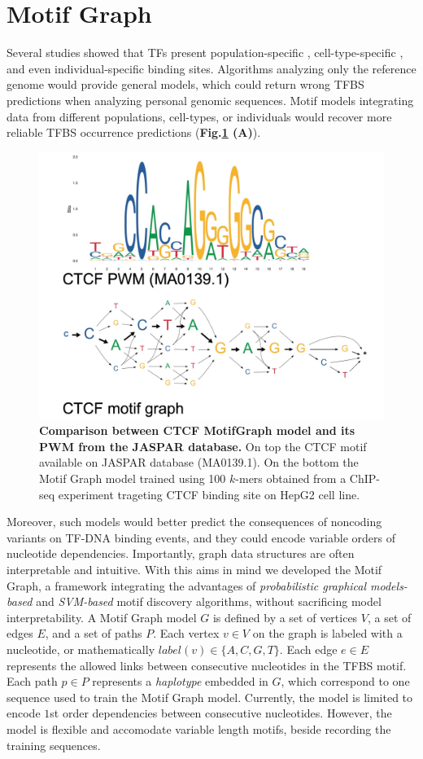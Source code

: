 \documentclass[a4paper, titlepage, 8pt, openright]{book}
\newcommand{\mychapter}[2]{
    \setcounter{chapter}{#1}
    \setcounter{section}{0}
    \chapter*{#2}
    \addcontentsline{toc}{chapter}{#2}
}
\begin{document}
\mychapter{3}{Motif Graph}
Several studies showed that TFs present population-specific \citep{kasowski2010variation}, cell-type-specific \citep{gertz2013distinct,arvey2012sequence}, and even individual-specific \citep{tognon2021grafimo} binding sites. Algorithms analyzing only the reference genome would provide general models, which could return wrong TFBS predictions when analyzing personal genomic sequences. Motif models integrating data from different populations, cell-types, or individuals would recover more reliable TFBS occurrence predictions (\textbf{Fig.\ref{fig:ctcf_mg} (A)}).
\begin{figure}
	\centering
	\includegraphics[width=\textwidth]{figures/ctcf_mg.jpg}
	\caption[Comparison between CTCF Motif Graph model and its PWM from the JASPAR database.]{\textbf{Comparison between CTCF MotifGraph model and its PWM from the JASPAR database.} On top the CTCF motif available on JASPAR database (MA0139.1). On the bottom the Motif Graph model trained using 100 $k$-mers obtained from a ChIP-seq experiment trageting CTCF binding site on HepG2 cell line.}
	\label{fig:ctcf_mg}
\end{figure} 
Moreover, such models would better predict the consequences of noncoding variants on TF-DNA binding events, and they could encode variable orders of nucleotide dependencies. Importantly, graph data structures are often interpretable and intuitive. With this aims in mind we developed the Motif Graph, a framework integrating the advantages of \emph{probabilistic graphical models-based} and \emph{SVM-based} motif discovery algorithms, without sacrificing model interpretability. A Motif Graph model $G$ is defined by a set of vertices $V$, a set of edges $E$, and a set of paths $P$. Each vertex $v \in V$ on the graph is labeled with a nucleotide, or mathematically $label(v) \in \{A, C, G, T\}$. Each edge $e \in E$ represents the allowed links between consecutive nucleotides in the TFBS motif. Each path $p \in P$ represents a \emph{haplotype} embedded in $G$, which correspond to one sequence used to train the Motif Graph model. Currently, the model is limited to encode $1$st order dependencies between consecutive nucleotides. However, the model is flexible and accomodate variable length motifs, beside recording the training sequences.
\end{document}
